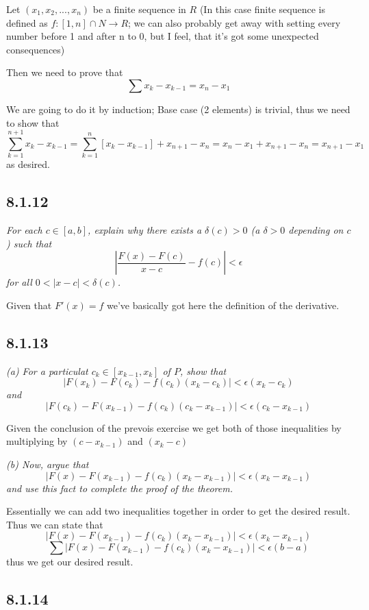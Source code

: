 \documentclass[11pt,oneside,titlepage]{book}
\begin{document}
Let $(x_1, x_2, ..., x_n)$ be a finite sequence in $R$ (In this case finite sequence is defined as
$f: [1, n] \cap N \to R$; we can also probably get away with setting every number before 1 and
after n to 0, but I feel, that it's got some unexpected consequences)

Then we need to prove that
$$ \sum x_k - x_{k - 1} = x_n - x_1$$

We are going to do it by induction; Base case (2 elements) is trivial, thus we need to show that
$$\sum_{k = 1}^{n + 1}{ x_{k} - x_{k - 1}} = \sum_{k = 1}^n{ [x_{k} - x_{k - 1}]} + x_{n + 1} - x_{n} =
x_n - x_1 + x_{n + 1} - x_n = x_{n + 1} - x_1$$
as desired.

\subsection*{8.1.12}
\textit{For each $c \in [a, b]$, explain why there exists a $\delta(c) > 0$ (a $\delta > 0$
  depending on $c$) such that}
$$\left|\frac{F(x) - F(c)}{x - c} - f(c)\right| < \epsilon$$
\textit{for all $0 < |x - c| < \delta(c)$.}

Given that $F'(x) = f$ we've basically got here the definition of the derivative.


\subsection*{8.1.13}
\textit{(a) For a particulat $c_k \in [x_{k - 1}, x_k]$ of $P$, show that }
$$|F(x_k) - F(c_k) - f(c_k)(x_k - c_k)| < \epsilon (x_k - c_k) $$
\textit{and}
$$|F(c_k) - F(x_{k - 1}) - f(c_k)(c_k - x_{k - 1})| < \epsilon (c_k - x_{k - 1}) $$

Given the conclusion of the prevois exercise we get both of those inequalities by
multiplying by $(c - x_{k - 1})$ and $(x_k - c)$

\textit{(b) Now, argue that }
$$|F(x) - F(x_{k - 1}) - f(c_k)(x_k - x_{k - 1})| < \epsilon(x_k - x_{k - 1})$$
\textit{and use this fact to complete the proof of the theorem.}

Essentially we can add two inequalities together in order to get the desired result.
Thus we can state that
$$|F(x) - F(x_{k - 1}) - f(c_k)(x_k - x_{k - 1})| < \epsilon(x_k - x_{k - 1})$$
$$\sum |F(x) - F(x_{k - 1}) - f(c_k)(x_k - x_{k - 1})| < \epsilon(b - a)$$
thus we get our desired result.

\subsection*{8.1.14}
\end{document}
